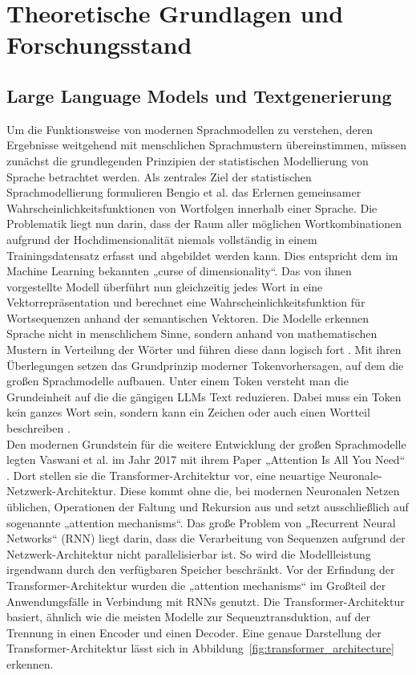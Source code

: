 \chapter{Theoretische Grundlagen und Forschungsstand}
\label{chap:related-work}

\section{Large Language Models und Textgenerierung}
\label{sec:LLMintro}
Um die Funktionsweise von modernen Sprachmodellen zu verstehen, deren Ergebnisse weitgehend mit menschlichen Sprachmustern übereinstimmen, müssen zunächst die grundlegenden Prinzipien der statistischen Modellierung von Sprache betrachtet werden. Als zentrales Ziel der statistischen Sprachmodellierung formulieren Bengio et al. \autocite{bengio2003neural} das Erlernen gemeinsamer Wahrscheinlichkeitsfunktionen von Wortfolgen innerhalb einer Sprache. Die Problematik liegt nun darin, dass der Raum aller möglichen Wortkombinationen aufgrund der Hochdimensionalität niemals vollständig in einem Trainingsdatensatz erfasst und abgebildet werden kann. Dies entspricht dem im Machine Learning bekannten „curse of dimensionality“. Das von ihnen vorgestellte Modell überführt nun gleichzeitig jedes Wort in eine Vektorrepräsentation und berechnet eine Wahrscheinlichkeitsfunktion für Wortsequenzen anhand der semantischen Vektoren. Die Modelle erkennen Sprache nicht in menschlichem Sinne, sondern anhand von mathematischen Mustern in Verteilung der Wörter und führen diese dann logisch fort \autocite{bengio2003neural}. Mit ihren Überlegungen setzen \autocite{bengio2003neural} das Grundprinzip moderner Tokenvorhersagen, auf dem die großen Sprachmodelle aufbauen. Unter einem Token versteht man die Grundeinheit auf die die gängigen LLMs Text reduzieren. Dabei muss ein Token kein ganzes Wort sein, sondern kann ein Zeichen oder auch einen Wortteil beschreiben \autocite{OpenAItokenDefinition}.\\
Den modernen Grundstein für die weitere Entwicklung der großen Sprachmodelle legten Vaswani et al. im Jahr 2017 mit ihrem Paper „Attention Is All You Need“ \autocite{vaswani2017attentionneed}. Dort stellen sie die Transformer-Architektur vor, eine neuartige Neuronale-Netzwerk-Architektur. Diese kommt ohne die, bei modernen Neuronalen Netzen üblichen, Operationen der Faltung und Rekursion aus und setzt ausschließlich auf sogenannte „attention mechanisms“. Das große Problem von „Recurrent Neural Networks“ (RNN) liegt darin, dass die Verarbeitung von Sequenzen aufgrund der Netzwerk-Architektur nicht parallelisierbar ist. So wird die Modellleistung irgendwann durch den verfügbaren Speicher beschränkt. Vor der Erfindung der Transformer-Architektur wurden die „attention mechanisms“ im Großteil der Anwendungsfälle in Verbindung mit RNNs genutzt. Die Transformer-Architektur basiert, ähnlich wie die meisten Modelle zur Sequenztransduktion, auf der Trennung in einen Encoder und einen Decoder. Eine genaue Darstellung der Transformer-Architektur lässt sich in Abbildung~\ref{fig:transformer_architecture} erkennen.

